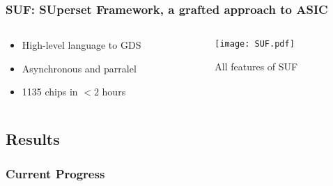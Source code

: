 \begin{frame}
    \frametitle{SUF: SUperset Framework, a grafted approach to ASIC}
\begin{columns}
\begin{column}{0.35\textwidth}
\begin{itemize}
    \item<1-> High-level language to GDS
    \item<1-> Asynchronous and parralel
    \item<1-> 1135 chips in $<2$ hours
\end{itemize}
\end{column}
\begin{column}{0.65\textwidth}
\begin{figure}
	\centering
	\texttt{[image: SUF.pdf]}
	\caption{All features of SUF}
\end{figure}
\end{column}

\end{columns}
\end{frame}

\subsection{Results}
\begin{frame}
    \frametitle{Current Progress}

    \tableofcontents[currentsection,
                     subsectionstyle=show/shaded/hide,
                     sectionstyle=show/hide]

\end{frame}

%

